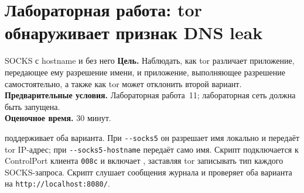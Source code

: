 \section{Лабораторная работа: tor обнаруживает признак DNS leak}\label{sec:lab-opsec}

\begin{laboratorio}[18]{SOCKS с hostname и без него}
\textbf{Цель.} Наблюдать, как tor различает приложение, передающее ему разрешение имени, и приложение, выполняющее разрешение самостоятельно, а также как tor может отклонить второй вариант.\\
\textbf{Предварительные условия.} Лабораторная работа~11; лабораторная сеть должна быть запущена.\\
\textbf{Оценочное время.} 30 минут.
\end{laboratorio}

 поддерживает оба варианта. При \texttt{-{}-socks5} он разрешает имя локально и передаёт tor IP-адрес; при \texttt{-{}-socks5-hostname} передаёт само имя. Скрипт  подключается к ControlPort клиента \texttt{008c} и включает , заставляя tor записывать тип каждого SOCKS-запроса. Скрипт слушает сообщения журнала и проверяет оба варианта на \texttt{http://localhost:8080/}.


